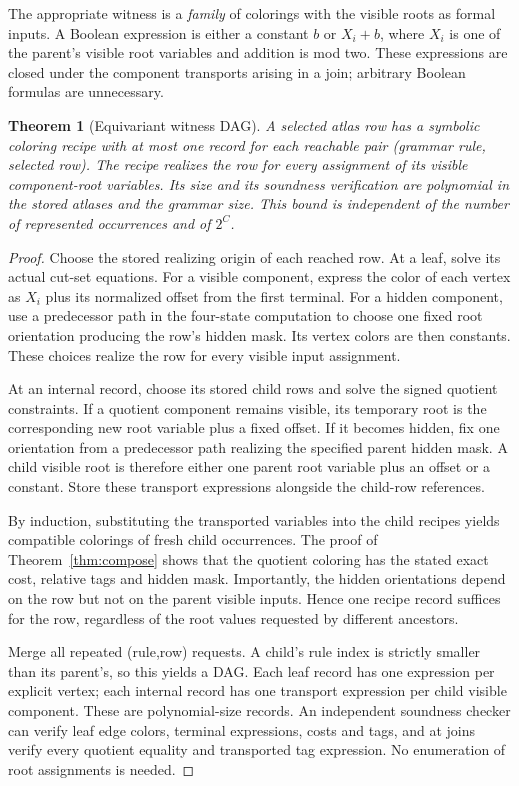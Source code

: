 \documentclass[11pt,letterpaper]{article}
\newtheorem{theorem}{Theorem}[section]
\theoremstyle{definition}
\theoremstyle{remark}\newtheorem{remark}[theorem]{Remark}
\begin{document}
The appropriate witness is a \emph{family} of colorings with the visible roots as formal inputs. A Boolean expression is either a constant $b$ or $X_i+b$, where $X_i$ is one of the parent's visible root variables and addition is mod two. These expressions are closed under the component transports arising in a join; arbitrary Boolean formulas are unnecessary.

\begin{theorem}[Equivariant witness DAG]\label{thm:witness}
A selected atlas row has a symbolic coloring recipe with at most one record for each reachable pair (grammar rule, selected row). The recipe realizes the row for \emph{every} assignment of its visible component-root variables. Its size and its soundness verification are polynomial in the stored atlases and the grammar size. This bound is independent of the number of represented occurrences and of $2^C$.
\end{theorem}
\begin{proof}
Choose the stored realizing origin of each reached row. At a leaf, solve its actual cut-set equations. For a visible component, express the color of each vertex as $X_i$ plus its normalized offset from the first terminal. For a hidden component, use a predecessor path in the four-state computation to choose one fixed root orientation producing the row's hidden mask. Its vertex colors are then constants. These choices realize the row for every visible input assignment.

At an internal record, choose its stored child rows and solve the signed quotient constraints. If a quotient component remains visible, its temporary root is the corresponding new root variable plus a fixed offset. If it becomes hidden, fix one orientation from a predecessor path realizing the specified parent hidden mask. A child visible root is therefore either one parent root variable plus an offset or a constant. Store these transport expressions alongside the child-row references.

By induction, substituting the transported variables into the child recipes yields compatible colorings of fresh child occurrences. The proof of Theorem~\ref{thm:compose} shows that the quotient coloring has the stated exact cost, relative tags and hidden mask. Importantly, the hidden orientations depend on the row but not on the parent visible inputs. Hence one recipe record suffices for the row, regardless of the root values requested by different ancestors.

Merge all repeated (rule,row) requests. A child's rule index is strictly smaller than its parent's, so this yields a DAG. Each leaf record has one expression per explicit vertex; each internal record has one transport expression per child visible component. These are polynomial-size records. An independent soundness checker can verify leaf edge colors, terminal expressions, costs and tags, and at joins verify every quotient equality and transported tag expression. No enumeration of root assignments is needed.
\end{proof}
\end{document}
